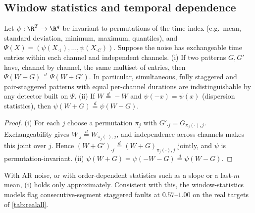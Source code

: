 \subsection{Window statistics and temporal dependence}
\begin{lemma}\label{lem:blind}
Let $\psi:\R^T\to\R^q$ be invariant to permutations of the time index (e.g.\ mean, standard deviation, minimum, maximum, quantiles), and $\Psi(X)=(\psi(X_{\cdot1}),\dots,\psi(X_{\cdot C}))$. Suppose the noise has exchangeable time entries within each channel and independent channels. (i) If two patterns $G,G'$ have, channel by channel, the same multiset of entries, then $\Psi(W+G)\overset{d}{=}\Psi(W+G')$. In particular, simultaneous, fully staggered and pair-staggered patterns with equal per-channel durations are indistinguishable by any detector built on $\Psi$. (ii) If $W\overset d=-W$ and $\psi(-x)=\psi(x)$ (dispersion statistics), then $\psi(W+G)\overset d=\psi(W-G)$.
\end{lemma}
\begin{proof}
(i) For each $j$ choose a permutation $\pi_j$ with $G'_{\cdot j}=G_{\pi_j(\cdot),j}$. Exchangeability gives $W_{\cdot j}\overset d=W_{\pi_j(\cdot),j}$, and independence across channels makes this joint over $j$. Hence $(W+G')_{\cdot j}\overset d=(W+G)_{\pi_j(\cdot),j}$ jointly, and $\psi$ is permutation-invariant. (ii) $\psi(W+G)=\psi(-W-G)\overset d=\psi(W-G)$.
\end{proof}
With AR noise, or with order-dependent statistics such as a slope or a last-$m$ mean, (i) holds only approximately. Consistent with this, the window-statistics models flag consecutive-segment staggered faults at $0.57$--$1.00$ on the real targets of \cref{tab:realall}.

